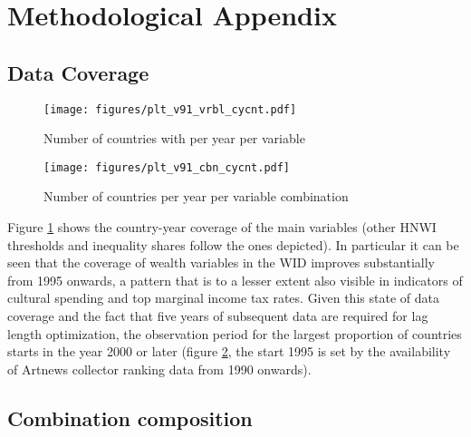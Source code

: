 \documentclass[11pt]{article}
\begin{document}
\begin{sloppypar}
\printbibliography
\end{sloppypar}

\clearpage
\FloatBarrier


\section*{Methodological Appendix}


\appendix
\setcounter{page}{1}


\renewcommand{\thesubsection}{\Alph{subsection}}



\subsection{Data Coverage}
\label{app_data_coverage}
\begin{figure}[htbp]
\centering
\texttt{[image: figures/plt\_v91\_vrbl\_cycnt.pdf]}
\caption{\label{fig:vrbl_cycnt}Number of countries with per year per variable}
\end{figure}



\begin{figure}[htbp]
\centering
\texttt{[image: figures/plt\_v91\_cbn\_cycnt.pdf]}
\caption{\label{fig:cbn_cycnt}Number of countries per year per variable combination}
\end{figure}



Figure \ref{fig:vrbl_cycnt} shows the country-year coverage of the main variables (other HNWI thresholds and inequality shares follow the ones depicted).
In particular it can be seen that the coverage of wealth variables in the WID improves substantially from 1995 onwards, a pattern that is to a lesser extent also visible in indicators of cultural spending and top marginal income tax rates.
Given this state of data coverage and the fact that five years of subsequent data are required for lag length optimization, the observation period for the largest proportion of countries starts in the year 2000 or later  (figure \ref{fig:cbn_cycnt}, the start 1995 is set by the availability of Artnews collector ranking data from 1990 onwards).

\subsection{Combination composition}
\end{document}
